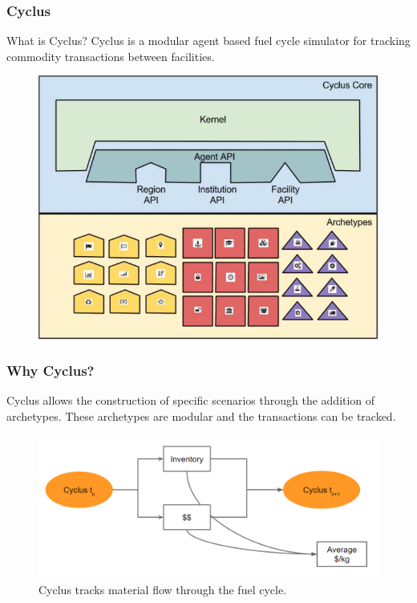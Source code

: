 \begin{frame}
	\frametitle{Cyclus}
    \begin{block}{What is Cyclus?}
    	Cyclus is a modular agent based fuel cycle simulator for tracking commodity transactions
    	between facilities.
    \end{block}
	\begin{figure}
		\centering
		\includegraphics[width=0.6\linewidth]{Cyclus_graph}
	\end{figure}
\end{frame}

\begin{frame}
\frametitle{Why Cyclus?}
	Cyclus allows the construction of specific scenarios through the addition of archetypes. These archetypes are
	modular and the transactions can be tracked.
	\begin{figure}
		\centering
		\includegraphics[width=0.9\linewidth]{cyclus-material-track}
		\caption{Cyclus tracks material flow through the fuel cycle.}
		\label{fig:tracking}
	\end{figure}
\end{frame}

